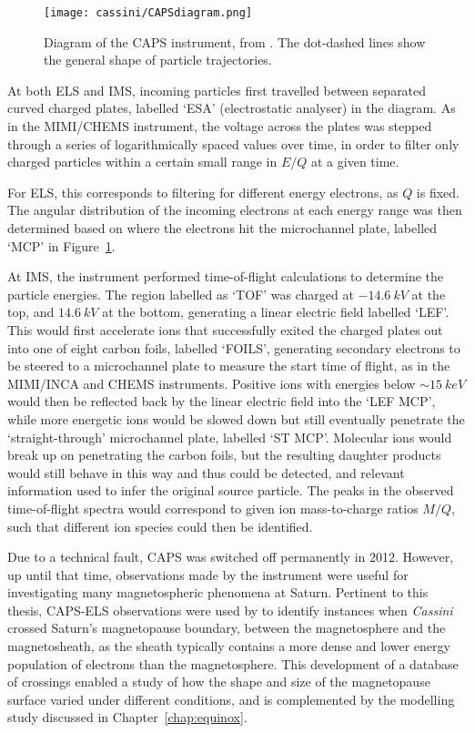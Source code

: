 \begin{figure}
\centering
\noindent\texttt{[image: cassini/CAPSdiagram.png]}
\caption[Diagram of the CAPS instrument.]{Diagram of the CAPS instrument, from \citet{young2004}. The dot-dashed lines show the general shape of particle trajectories.}
\label{cassini:fig:CAPSdiagram}
\end{figure}

At both ELS and IMS, incoming particles first travelled between separated curved charged plates, labelled `ESA' (electrostatic analyser) in  the diagram. As in the MIMI/CHEMS instrument, the voltage across the plates was stepped through a series of logarithmically spaced values over time, in order to filter only charged particles within a certain small range in $E/Q$ at a given time. 

For ELS, this corresponds to filtering for different energy electrons, as $Q$ is fixed. The angular distribution of the incoming electrons at each energy range was then determined based on where the electrons hit the microchannel plate, labelled `MCP' in Figure~\ref{cassini:fig:CAPSdiagram}. 

At IMS,  the instrument performed time-of-flight calculations to determine the particle energies. The region labelled as `TOF' was charged at $\SI{-14.6}{kV}$ at the top, and $\SI{+14.6}{kV}$ at the bottom, generating a linear electric field labelled `LEF'. This would first  accelerate ions that successfully exited the charged plates out into one of eight carbon foils,  labelled `FOILS', generating secondary electrons to be steered to a microchannel plate to measure the start time of flight, as in the MIMI/INCA and CHEMS instruments. Positive ions with energies below ${\sim}\SI{15}{keV}$ would then be reflected back by the linear electric field into the `LEF MCP', while more energetic ions would be slowed down but still eventually penetrate the `straight-through' microchannel plate, labelled `ST MCP'. Molecular ions would break up on penetrating the carbon foils, but  the resulting daughter  products would still behave in this way and thus could be detected, and relevant information used to infer the original source particle. The peaks in the observed time-of-flight spectra would correspond to given ion mass-to-charge ratios $M/Q$, such that different ion species could then be identified.

Due to a technical fault, CAPS was switched off permanently in 2012. However, up until that time, observations made by the instrument were useful for investigating many magnetospheric phenomena at Saturn. Pertinent to  this  thesis, CAPS-ELS observations were used by \citet{pilkington2015} to identify instances when \textit{Cassini} crossed Saturn's magnetopause boundary, between the magnetosphere and the magnetosheath, as the sheath typically contains a more dense and lower energy population of electrons than the magnetosphere. This development of a database of crossings enabled a study of how the shape and size of the magnetopause surface varied under different conditions, and is complemented by the modelling study discussed in Chapter~\ref{chap:equinox}.

